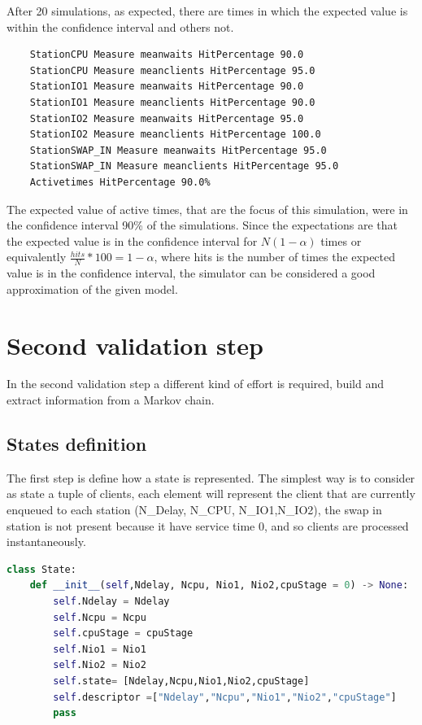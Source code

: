\documentclass[12pt,a4paper]{article}
\begin{document}
After 20 simulations, as expected, there are times in which the expected value is within the confidence interval and others not. 
\begin{verbatim}
    StationCPU Measure meanwaits HitPercentage 90.0
    StationCPU Measure meanclients HitPercentage 95.0
    StationIO1 Measure meanwaits HitPercentage 90.0
    StationIO1 Measure meanclients HitPercentage 90.0
    StationIO2 Measure meanwaits HitPercentage 95.0
    StationIO2 Measure meanclients HitPercentage 100.0
    StationSWAP_IN Measure meanwaits HitPercentage 95.0
    StationSWAP_IN Measure meanclients HitPercentage 95.0
    Activetimes HitPercentage 90.0%
\end{verbatim}

The expected value of active times, that are the focus of this simulation, were in the confidence interval 90\% of the simulations. Since the expectations are that the expected value is in the confidence interval for $N(1-\alpha)$ times or equivalently $\frac{hits}{N}*100=1-\alpha$, where hits is the number of times the expected value is in the confidence interval, the simulator can be considered a good approximation of the given model.



\section{Second validation step}
In the second validation step a different kind of effort is required, build and extract information from a Markov chain.
\subsection{States definition}
The first step is define how a state is represented. The simplest way is to consider as state a tuple of clients, each element will represent the client that are currently enqueued to each station (N\_Delay, N\_CPU, N\_IO1,N\_IO2), the swap in station is not present because it have service time 0, and so clients are processed instantaneously. 
\begin{lstlisting}[language=python]
class State:
    def __init__(self,Ndelay, Ncpu, Nio1, Nio2,cpuStage = 0) -> None:
        self.Ndelay = Ndelay
        self.Ncpu = Ncpu
        self.cpuStage = cpuStage
        self.Nio1 = Nio1
        self.Nio2 = Nio2
        self.state= [Ndelay,Ncpu,Nio1,Nio2,cpuStage]
        self.descriptor =["Ndelay","Ncpu","Nio1","Nio2","cpuStage"]
        pass
\end{lstlisting}
\end{document}
